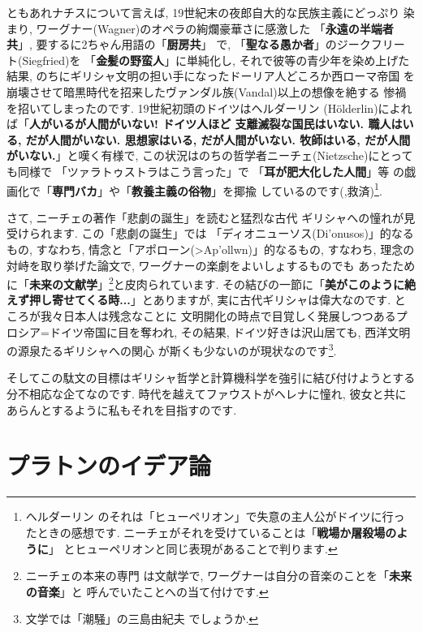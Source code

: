\documentclass[b5j,8pt,twocolumn]{ltjsarticle}
\newcommand{\textgreek}[1]{\begingroup\fontencoding{LGR}\selectfont#1\endgroup}
\begin{document}
ともあれナチスについて言えば, 19世紀末の夜郎自大的な民族主義にどっぷり
染まり, ワーグナー(Wagner)のオペラの絢爛豪華さに感激した
「\textbf{永遠の半端者共}」, 要するに2ちゃん用語の「\textbf{厨房共}」
で, 「\textbf{聖なる愚か者}」のジークフリート(Siegfried)を
「\textbf{金髪の野蛮人}」に単純化し, それで彼等の青少年を染め上げた
結果, のちにギリシャ文明の担い手になったドーリア人どころか西ローマ帝国
を崩壊させて暗黒時代を招来したヴァンダル族(Vandal)以上の想像を絶する
惨禍を招いてしまったのです. 19世紀初頭のドイツはヘルダーリン
(H\"olderlin)によれば「\textbf{人がいるが人間がいない! ドイツ人ほど
支離滅裂な国民はいない. 職人はいる, だが人間がいない. 思想家はいる,
 だが人間がいない. 牧師はいる, だが人間がいない.}」と嘆く有様で,
 この状況はのちの哲学者ニーチェ(Nietzsche)にとっても同様で
「ツァラトゥストラはこう言った」で 「\textbf{耳が肥大化した人間}」等
の戯画化で「\textbf{専門バカ}」や「\textbf{教養主義の俗物}」を揶揄
しているのです(\cite{ツァラトゥストラ},救済)\footnote{ヘルダーリン
のそれは「ヒューペリオン」で失意の主人公がドイツに行ったときの感想です.
 ニーチェがそれを受けていることは「\textbf{戦場か屠殺場のように}」
 とヒューペリオンと同じ表現があることで判ります.}.
\newline

さて, ニーチェの著作「悲劇の誕生」\cite{悲劇の誕生}を読むと猛烈な古代
ギリシャへの憧れが見受けられます. この「悲劇の誕生」では
「ディオニューソス(\textgreek{Di'onusos})」的なるもの, すなわち,
情念と「アポローン(\textgreek{>Ap'ollwn})」的なるもの, すなわち,
 理念の対峙を取り挙げた論文で, ワーグナーの楽劇をよいしょするものでも
あったために「\textbf{未来の文献学}」\footnote{ニーチェの本来の専門
は文献学で, ワーグナーは自分の音楽のことを「\textbf{未来の音楽}」と
呼んでいたことへの当て付けです.}と皮肉られています. その結びの一節に「\textbf{美がこのように絶えず押し寄せてくる時...}」とありますが,
 実に古代ギリシャは偉大なのです. ところが我々日本人は残念なことに
文明開化の時点で目覚しく発展しつつあるプロシア=ドイツ帝国に目を奪われ,
 その結果, ドイツ好きは沢山居ても, 西洋文明の源泉たるギリシャへの関心
が斯くも少ないのが現状なのです\footnote{文学では「潮騒」の三島由紀夫
でしょうか.}.
\newline

そしてこの駄文の目標はギリシャ哲学と計算機科学を強引に結び付けようとする
分不相応な企てなのです. 時代を越えてファウストがヘレナに憧れ, 彼女と共に
あらんとするように私もそれを目指すのです.

\section{プラトンのイデア論}
\end{document}

